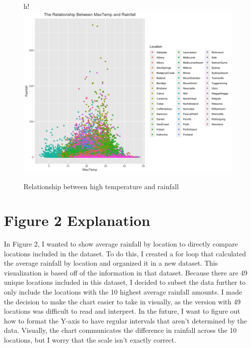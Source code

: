 \documentclass{article}
\begin{document}
\begin{figure} {h!}
\centering
\includegraphics[scale=0.3]{PS6a_Nadolski.png}
\caption{Relationship between high temperature and rainfall}
\label{fig:a}
\end{figure}

\section{Figure 2 Explanation}
In Figure 2, I wanted to show average rainfall by location to directly compare locations included in the dataset. To do this, I created a for loop that calculated the average rainfall by location and organized it in a new dataset. This visualization is based off of the information in that dataset. Because there are 49 unique locations included in this dataset, I decided to subset the data further to only include the locations with the 10 highest average rainfall amounts. I made the decision to make the chart easier to take in visually, as the version with 49 locations was difficult to read and interpret. In the future, I want to figure out how to format the Y-axis to have regular intervals that aren't determined by the data. Visually, the chart communicates the difference in rainfall across the 10 locations, but I worry that the scale isn't exactly correct. 
\end{document}
